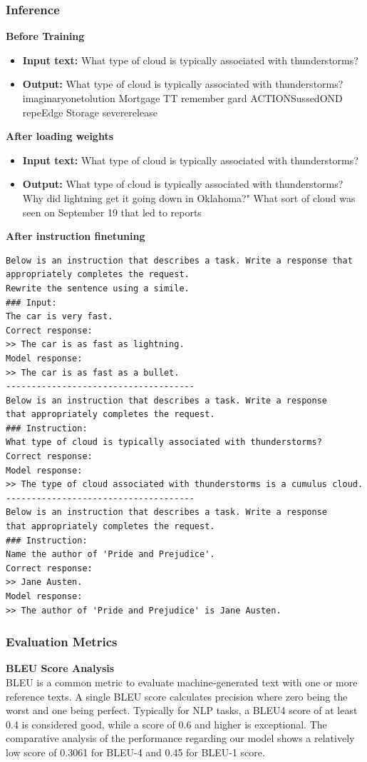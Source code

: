 \subsubsection{Inference}
\textbf{Before Training}
\begin{itemize}
    \item \textbf{Input text:} What type of cloud is typically associated with thunderstorms?
    \item \textbf{Output:} What type of cloud is typically associated with thunderstorms? imaginaryonetolution Mortgage TT remember gard ACTIONSussedOND repeEdge Storage severerelease
\end{itemize}

\textbf{After loading weights}
\begin{itemize}
    \item \textbf{Input text:} What type of cloud is typically associated with thunderstorms?
    \item \textbf{Output:} What type of cloud is typically associated with thunderstorms? Why did lightning get it going down in Oklahoma?" What sort of cloud was seen on September 19 that led to reports
\end{itemize}

\textbf{After instruction finetuning}
\begin{verbatim}
Below is an instruction that describes a task. Write a response that 
appropriately completes the request.
Rewrite the sentence using a simile.
### Input:
The car is very fast.
Correct response:
>> The car is as fast as lightning.
Model response:
>> The car is as fast as a bullet.
-------------------------------------
Below is an instruction that describes a task. Write a response 
that appropriately completes the request.
### Instruction:
What type of cloud is typically associated with thunderstorms?
Correct response:
Model response:
>> The type of cloud associated with thunderstorms is a cumulus cloud.
-------------------------------------
Below is an instruction that describes a task. Write a response 
that appropriately completes the request.
### Instruction:
Name the author of 'Pride and Prejudice'.
Correct response:
>> Jane Austen.
Model response:
>> The author of 'Pride and Prejudice' is Jane Austen.
\end{verbatim}

\subsubsection{Evaluation Metrics}
\textbf{BLEU Score Analysis}\\
BLEU is a common metric to evaluate machine‐generated text with one or more
reference texts. A single BLEU score calculates precision where zero being the worst and
one being perfect. Typically for NLP tasks, a BLEU4 score of at least 0.4 is
considered good, while a score of 0.6 and higher is exceptional. The comparative analysis of the performance regarding our model shows a relatively low score of 0.3061 for BLEU-4 and 0.45 for BLEU-1 score.

